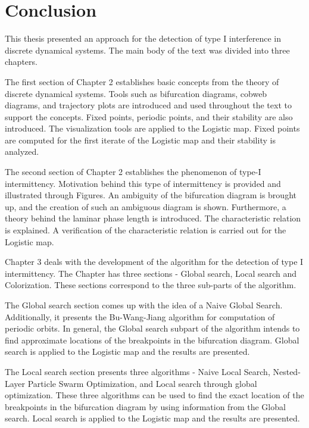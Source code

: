 \chapter{Conclusion}

This thesis presented an approach for the detection of type I interference in discrete dynamical systems.
The main body of the text was divided into three chapters.
\par
The first section of Chapter 2 establishes basic concepts from the theory of discrete dynamical systems.
Tools such as bifurcation diagrams, cobweb diagrams, and trajectory plots are introduced and used throughout the text to support the concepts.
Fixed points, periodic points, and their stability are also introduced.
The visualization tools are applied to the Logistic map.
Fixed points are computed for the first iterate of the Logistic map and their stability is analyzed.
\par
The second section of Chapter 2 establishes the phenomenon of type-I intermittency.
Motivation behind this type of intermittency is provided and illustrated through Figures.
An ambiguity of the bifurcation diagram is brought up, and the creation of such an ambiguous diagram is shown.
Furthermore, a theory behind the laminar phase length is introduced.
The characteristic relation is explained.
A verification of the characteristic relation is carried out for the Logistic map.
\par
Chapter 3 deals with the development of the algorithm for the detection of type I intermittency.
The Chapter has three sections - Global search, Local search and Colorization.
These sections correspond to the three sub-parts of the algorithm.
\par
The Global search section comes up with the idea of a Naive Global Search.
Additionally, it presents the Bu-Wang-Jiang algorithm for computation of periodic orbits.
In general, the Global search subpart of the algorithm intends to find approximate locations of the breakpoints in the bifurcation diagram.
Global search is applied to the Logistic map and the results are presented.
\par
The Local search section presents three algorithms - Naive Local Search, Nested-Layer Particle Swarm Optimization, and Local search through global optimization.
These three algorithms can be used to find the exact location of the breakpoints in the bifurcation diagram by using information from the Global search.
Local search is applied to the Logistic map and the results are presented.
\par
